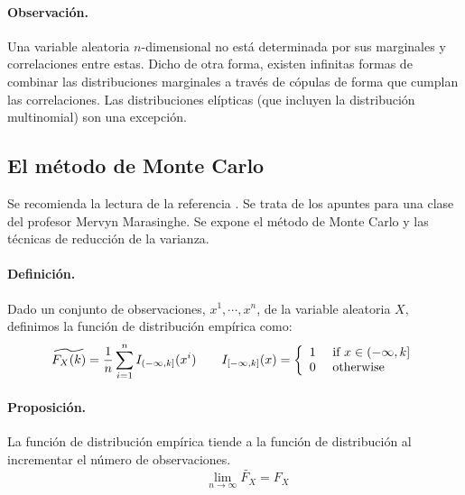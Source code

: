 \paragraph{Observaci\'on.} Una variable aleatoria $n$-dimensional no est\'a 
determinada por sus marginales y correlaciones entre estas. Dicho de otra
forma, existen infinitas formas de combinar las distribuciones marginales
 a trav\'es de c\'opulas de forma que cumplan las correlaciones. Las distribuciones 
el\'ipticas (que incluyen la distribuci\'on multinomial) son una excepci\'on. 


\subsection{El m\'etodo de Monte Carlo}

Se recomienda la lectura de la referencia \cite{mc:mervyn}. Se trata de los 
apuntes para una clase del profesor Mervyn Marasinghe. Se expone el m\'etodo 
de Monte Carlo y las t\'ecnicas de reducci\'on de la varianza.

\paragraph{Definici\'on.} Dado un conjunto de observaciones, $x^1, \cdots, x^n$,
de la variable aleatoria $X$, definimos la funci\'on de distribuci\'on emp\'irica 
como:
\begin{displaymath}
\widetilde{F_X(k)} = \frac{1}{n} \sum_{i=1}^{n} I_{(-\infty,k]}(x^i) \qquad
I_{[-\infty,k]}(x) = \left\{
\begin{array}{ll}
1 & \textrm{ if } x \in (-\infty,k] \cr
0 & \textrm{ otherwise}
\end{array}
\right.
\end{displaymath}

\paragraph{Proposici\'on.} La funci\'on de distribuci\'on emp\'irica tiende a 
la funci\'on de distribuci\'on al incrementar el n\'umero de observaciones.
\begin{displaymath}
\qquad \lim_{n\to\infty} \widetilde{F_X} = F_X
\end{displaymath}

